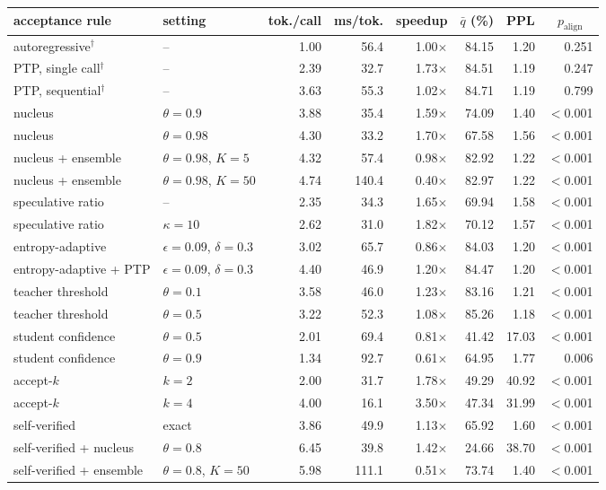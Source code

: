 {\setlength{\tabcolsep}{4pt}%
\begin{tabular}{llrrrrrr}
\toprule
acceptance rule & setting & \multicolumn{1}{c}{tok./call} & \multicolumn{1}{c}{ms/tok.} & \multicolumn{1}{c}{speedup} & \multicolumn{1}{c}{$\bar q$ (\%)} & \multicolumn{1}{c}{PPL} & \multicolumn{1}{c}{$p_{\mathrm{align}}$} \\
\midrule
autoregressive$^\dagger$ & -- & 1.00 & 56.4 & 1.00$\times$ & 84.15 & 1.20 & 0.251 \\
PTP, single call$^\dagger$ & -- & 2.39 & 32.7 & 1.73$\times$ & 84.51 & 1.19 & 0.247 \\
PTP, sequential$^\dagger$ & -- & 3.63 & 55.3 & 1.02$\times$ & 84.71 & 1.19 & 0.799 \\
nucleus & $\theta=0.9$ & 3.88 & 35.4 & 1.59$\times$ & 74.09 & 1.40 & $<$0.001 \\
nucleus & $\theta=0.98$ & 4.30 & 33.2 & 1.70$\times$ & 67.58 & 1.56 & $<$0.001 \\
nucleus + ensemble & $\theta=0.98$, $K=5$ & 4.32 & 57.4 & 0.98$\times$ & 82.92 & 1.22 & $<$0.001 \\
nucleus + ensemble & $\theta=0.98$, $K=50$ & 4.74 & 140.4 & 0.40$\times$ & 82.97 & 1.22 & $<$0.001 \\
speculative ratio & -- & 2.35 & 34.3 & 1.65$\times$ & 69.94 & 1.58 & $<$0.001 \\
speculative ratio & $\kappa=10$ & 2.62 & 31.0 & 1.82$\times$ & 70.12 & 1.57 & $<$0.001 \\
entropy-adaptive & $\epsilon=0.09$, $\delta=0.3$ & 3.02 & 65.7 & 0.86$\times$ & 84.03 & 1.20 & $<$0.001 \\
entropy-adaptive + PTP & $\epsilon=0.09$, $\delta=0.3$ & 4.40 & 46.9 & 1.20$\times$ & 84.47 & 1.20 & $<$0.001 \\
teacher threshold & $\theta=0.1$ & 3.58 & 46.0 & 1.23$\times$ & 83.16 & 1.21 & $<$0.001 \\
teacher threshold & $\theta=0.5$ & 3.22 & 52.3 & 1.08$\times$ & 85.26 & 1.18 & $<$0.001 \\
student confidence & $\theta=0.5$ & 2.01 & 69.4 & 0.81$\times$ & 41.42 & 17.03 & $<$0.001 \\
student confidence & $\theta=0.9$ & 1.34 & 92.7 & 0.61$\times$ & 64.95 & 1.77 & 0.006 \\
accept-$k$ & $k=2$ & 2.00 & 31.7 & 1.78$\times$ & 49.29 & 40.92 & $<$0.001 \\
accept-$k$ & $k=4$ & 4.00 & 16.1 & 3.50$\times$ & 47.34 & 31.99 & $<$0.001 \\
self-verified & exact & 3.86 & 49.9 & 1.13$\times$ & 65.92 & 1.60 & $<$0.001 \\
self-verified + nucleus & $\theta=0.8$ & 6.45 & 39.8 & 1.42$\times$ & 24.66 & 38.70 & $<$0.001 \\
self-verified + ensemble & $\theta=0.8$, $K=50$ & 5.98 & 111.1 & 0.51$\times$ & 73.74 & 1.40 & $<$0.001 \\
\bottomrule
\end{tabular}
}